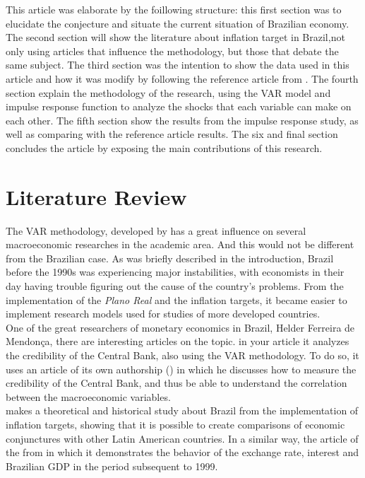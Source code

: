 \documentclass[hidelinks,12pt]{article}
\begin{document}
This article was elaborate by the foillowing structure: this first section was to elucidate the conjecture and situate the current situation of Brazilian economy. The second section will show the literature about inflation target in Brazil,not only using articles that influence the methodology, but those that debate the same subject. The third section was the intention to show the data used in this article and how it was modify by following the reference article from \citet{c15}. The fourth section explain the methodology of the research, using the VAR model and impulse response function to analyze the shocks that each variable can make on each other. The fifth section show the results from the impulse response study, as well as comparing with the reference article results. The six and final section concludes the article by exposing the main contributions of this research.


	
	\section{Literature Review}
	
The VAR methodology, developed by \citet{s80} 
has a great influence on several macroeconomic researches in the academic area. And this would not be different from the Brazilian case. As was briefly described in the introduction, Brazil before the 1990s was experiencing major instabilities, with economists in their day having trouble figuring out the cause of the country's problems. From the implementation of the \textit{Plano Real} and the inflation targets, it became easier to implement research models used for studies of more developed countries.\\
One of the great researchers of monetary economics in Brazil, Helder Ferreira de Mendonça, there are interesting articles on the topic. in your article \citet{h05}it analyzes the credibility of the Central Bank, also using the VAR methodology. To do so, it uses an article of its own authorship (\citet{h19}) in which he discusses how to measure the credibility of the Central Bank, and thus be able to understand the correlation between the macroeconomic variables. \\
\citet{p11} makes a theoretical and historical study about Brazil from the implementation of inflation targets, showing that it is possible to create comparisons of economic conjunctures with other Latin American countries. In a similar way, the article of the from \citet{nb08} in which it demonstrates the behavior of the exchange rate, interest and Brazilian GDP in the period subsequent to 1999.
	
\end{document}
